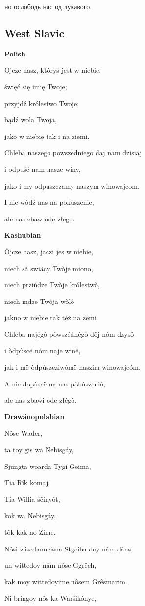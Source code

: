но ослободь нас од лукавого.

\subsection{West Slavic}

\textbf{Polish}

Ojcze nasz, któryś jest w niebie,

święć się imię Twoje;

przyjdź królestwo Twoje;

bądź wola Twoja,

jako w niebie tak i na ziemi.

Chleba naszego powszedniego daj nam dzisiaj

i odpuść nam nasze winy,

jako i my odpuszczamy naszym winowajcom.

I nie wódź nas na pokuszenie,

ale nas zbaw ode złego.

\textbf{Kashubian}

Òjcze nasz, jaczi jes w niebie,

niech sã swiãcy Twòje miono,

niech przińdze Twòje królestwò,

niech mdze Twòja wòlô

jakno w niebie tak téż na zemi.

Chleba najégò pòwszédnégò dôj nóm dzysô

i òdpùscë nóm naje winë,

jak i më òdpùszcziwómë naszim winowajcóm.

A nie dopùscë na nas pòkùszeniô,

ale nas zbawi òde złégò.

\textbf{Drawänopolabian}

Nôse Wader,

ta toy gis wa Nebisgáy,

Sjungta woarda Tygí Geima,

Tia Rîk komaj,

Tia Willia śčinyôt,

kok wa Nebisgáy,

tôk kak no Zime.

Nôsi wisedanneisna Stgeiba doy nâm dâns,

un wittedoy nâm nôse Ggrêch,

kak moy wittedoyime nôsem Grêsmarim.

Ni bringoy nôs ka Warśikónye,

